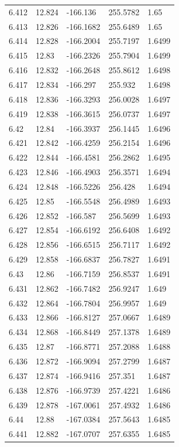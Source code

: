 \begin{tabular}{lllll}
6.412 & 12.824 & -166.136 & 255.5782 & 1.65 \\
6.413 & 12.826 & -166.1682 & 255.6489 & 1.65 \\
6.414 & 12.828 & -166.2004 & 255.7197 & 1.6499 \\
6.415 & 12.83 & -166.2326 & 255.7904 & 1.6499 \\
6.416 & 12.832 & -166.2648 & 255.8612 & 1.6498 \\
6.417 & 12.834 & -166.297 & 255.932 & 1.6498 \\
6.418 & 12.836 & -166.3293 & 256.0028 & 1.6497 \\
6.419 & 12.838 & -166.3615 & 256.0737 & 1.6497 \\
6.42 & 12.84 & -166.3937 & 256.1445 & 1.6496 \\
6.421 & 12.842 & -166.4259 & 256.2154 & 1.6496 \\
6.422 & 12.844 & -166.4581 & 256.2862 & 1.6495 \\
6.423 & 12.846 & -166.4903 & 256.3571 & 1.6494 \\
6.424 & 12.848 & -166.5226 & 256.428 & 1.6494 \\
6.425 & 12.85 & -166.5548 & 256.4989 & 1.6493 \\
6.426 & 12.852 & -166.587 & 256.5699 & 1.6493 \\
6.427 & 12.854 & -166.6192 & 256.6408 & 1.6492 \\
6.428 & 12.856 & -166.6515 & 256.7117 & 1.6492 \\
6.429 & 12.858 & -166.6837 & 256.7827 & 1.6491 \\
6.43 & 12.86 & -166.7159 & 256.8537 & 1.6491 \\
6.431 & 12.862 & -166.7482 & 256.9247 & 1.649 \\
6.432 & 12.864 & -166.7804 & 256.9957 & 1.649 \\
6.433 & 12.866 & -166.8127 & 257.0667 & 1.6489 \\
6.434 & 12.868 & -166.8449 & 257.1378 & 1.6489 \\
6.435 & 12.87 & -166.8771 & 257.2088 & 1.6488 \\
6.436 & 12.872 & -166.9094 & 257.2799 & 1.6487 \\
6.437 & 12.874 & -166.9416 & 257.351 & 1.6487 \\
6.438 & 12.876 & -166.9739 & 257.4221 & 1.6486 \\
6.439 & 12.878 & -167.0061 & 257.4932 & 1.6486 \\
6.44 & 12.88 & -167.0384 & 257.5643 & 1.6485 \\
6.441 & 12.882 & -167.0707 & 257.6355 & 1.6485 \\

\end{tabular}
